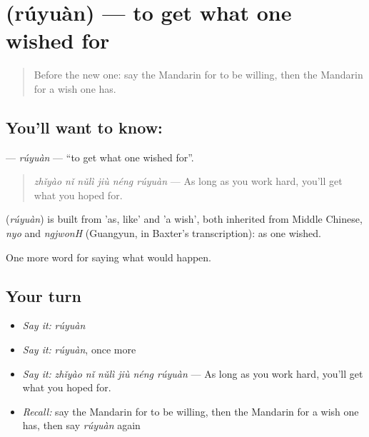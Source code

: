 \section[\texorpdfstring{\zh{如愿} (rúyuàn)}{如愿 (rúyuàn)}]{ (rúyuàn) — to get what one wished for}

\label{lesson:ZH-C535-ruyuan}



\begin{quote}
Before the new one: say the Mandarin for to be willing, then the Mandarin for a wish one has.
\end{quote}

\subsection*{You'll want to know: }
\textbf{} — \emph{rúyuàn} — \textquotedblleft{}to get what one wished for\textquotedblright{}.

\begin{quote}
\emph{zhǐyào nǐ nǔlì jiù néng rúyuàn} — As long as you work hard, you'll get what you hoped for.
\end{quote}

\begin{cousinweb}
\textbf{} (\emph{rúyuàn}) is built from  'as, like' and  'a wish', both inherited from Middle Chinese, \emph{nyo} and \emph{ngjwonH} (Guangyun, in Baxter's transcription): as one wished.
\end{cousinweb}

\begin{grammarlens}[title={What you've built}]
One more word for saying what would happen.
\end{grammarlens}

\subsection*{Your turn}
\begin{itemize}
\raggedright
  \item \emph{Say it:} \emph{rúyuàn}
  \item \emph{Say it:} \emph{rúyuàn}, once more
  \item \emph{Say it:} \emph{zhǐyào nǐ nǔlì jiù néng rúyuàn} — As long as you work hard, you'll get what you hoped for.
  \item \emph{Recall:} say the Mandarin for to be willing, then the Mandarin for a wish one has, then say \emph{rúyuàn} again
\end{itemize}


